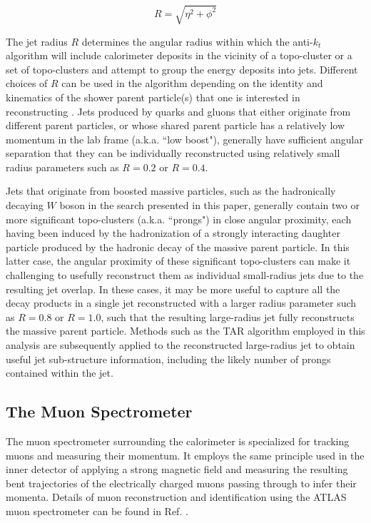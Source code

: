 \begin{equation}
\label{eq:jet_radius}
R = \sqrt{\eta^2 + \phi^2}
\end{equation}

The jet radius \(R\) determines the angular radius within which the anti-\(k_t\) algorithm will include calorimeter deposits in the vicinity of a topo-cluster or a set of topo-clusters and attempt to group the energy deposits into jets. Different choices of \(R\) can be used in the algorithm depending on the identity and kinematics of the shower parent particle(s) that one is interested in reconstructing \cite{jet_reco}. Jets produced by quarks and gluons that either originate from different parent particles, or whose shared parent particle has a relatively low momentum in the lab frame (a.k.a. ``low boost"), generally have sufficient angular separation that they can be individually reconstructed using relatively small radius parameters such as \(R=0.2\) or \(R=0.4\). 

Jets that originate from boosted massive particles, such as the hadronically decaying \(W\) boson in the search presented in this paper, generally contain two or more significant topo-clusters (a.k.a. ``prongs") in close angular proximity, each having been induced by the hadronization of a strongly interacting daughter particle produced by the hadronic decay of the massive parent particle. In this latter case, the angular proximity of these significant topo-clusters can make it challenging to usefully reconstruct them as individual small-radius jets due to the resulting jet overlap. In these cases, it may be more useful to capture all the decay products in a single jet reconstructed with a larger radius parameter such as \(R=0.8\) or \(R=1.0\), such that the resulting large-radius jet fully reconstructs the massive parent particle. Methods such as the TAR algorithm \cite{TAR_algo} employed in this analysis are subsequently applied to the reconstructed large-radius jet to obtain useful jet sub-structure information, including the likely number of prongs contained within the jet.

\subsection{The Muon Spectrometer}
\label{sec:muon_spec}

The muon spectrometer \cite{muon_spec_tdr} surrounding the calorimeter is specialized for tracking muons and measuring their momentum. It employs the same principle used in the inner detector of applying a strong magnetic field and measuring the resulting bent trajectories of the electrically charged muons passing through to infer their momenta. Details of muon reconstruction and identification using the ATLAS muon spectrometer can be found in Ref. \cite{muon_reco}.

